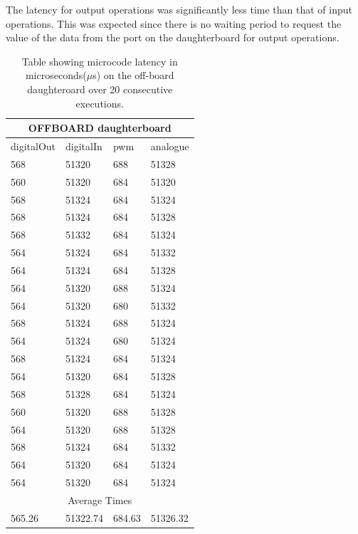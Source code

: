 The latency for output operations was significantly less time than that of input operations. This was expected since there is no waiting period to request the value of the data from the port on the daughterboard for output operations.  

\begin{table}
	\centering
	\caption{Table showing microcode latency in microseconds($\mu$s) on the off-board daughteroard over 20 consecutive executions.}
	
	\begin{tabular}{|l|l|l|l|}
	\toprule
 \multicolumn{4}{c}{\textbf{OFFBOARD daughterboard}} \\\hline
digitalOut & digitalIn & pwm & analogue\\\hline
568 & 51320 & 688 & 51328\\\hline
560 & 51320 & 684 & 51320\\\hline
568 & 51324 & 684 & 51324\\\hline
568 & 51324 & 684 & 51328\\\hline
568 & 51332 & 684 & 51324\\\hline
564 & 51324 & 684 & 51332\\\hline
564 & 51324 & 684 & 51328\\\hline
564 & 51320 & 688 & 51324\\\hline
564 & 51320 & 680 & 51332\\\hline
568 & 51324 & 688 & 51324\\\hline
564 & 51324 & 680 & 51324\\\hline
568 & 51324 & 684 & 51324\\\hline
564 & 51320 & 684 & 51328\\\hline
568 & 51328 & 684 & 51324\\\hline
560 & 51320 & 688 & 51328\\\hline
564 & 51320 & 688 & 51328\\\hline
568 & 51324 & 684 & 51332\\\hline
564 & 51320 & 684 & 51324\\\hline
564 & 51320 & 684 & 51324\\\hline
\multicolumn{4}{c}{Average Times} \\\hline
565.26 & 51322.74 & 684.63 & 51326.32

\end{tabular}
\end{table}

